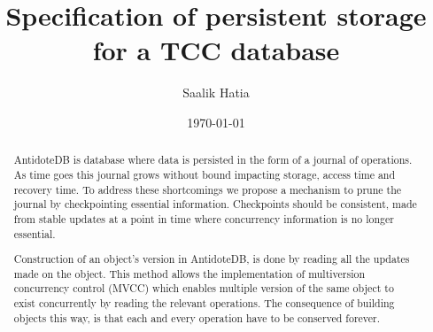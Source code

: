 \documentclass[11pt]{article}
\begin{document}
\author{Saalik Hatia}
\title{Specification of persistent storage for a TCC database}
\date\today
\maketitle

\begin{abstract}

  
  

  AntidoteDB is database where data is persisted in the form of 
  a journal of operations. 
  As time goes this journal grows without bound impacting storage, access time and 
  recovery time.
  To address these shortcomings we propose a mechanism to prune the journal by 
  checkpointing essential information.
  Checkpoints should be consistent, made from stable updates at a point
  in time where concurrency information is no longer essential.
  
  Construction of an object's version in AntidoteDB, is done by reading all the updates made on the object.
  This method allows the implementation of multiversion concurrency
  control (MVCC) which enables multiple version of the same object to exist
  concurrently by reading the relevant operations.
  The consequence of building objects this way, is that each and every operation 
  have to be conserved forever.


\end{abstract}
\end{document}
